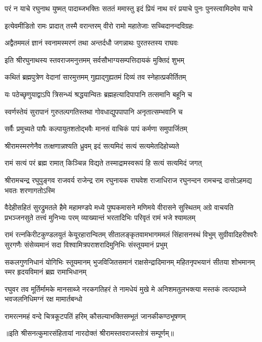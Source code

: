 \fourlineindentedshloka
{परं न याचे रघुनाथ युष्मत्}
{पादाब्जभक्तिः सततं ममास्तु}
{इदं प्रियं नाथ वरं प्रयाचे}
{पुनः पुनस्त्वामिदमेव याचे}%


\twolineshloka
{इत्येवमीडितो रामः प्रादात् तस्मै वरान्तरम्}
{वीरो रामो महातेजाः सच्चिदानन्दविग्रहः}%

\twolineshloka
{अद्वैतममलं ज्ञानं स्वनामस्मरणं तथा}
{अन्तर्दधौ जगन्नाथः पुरतस्तस्य राघवः}%

\twolineshloka
{इति श्रीरघुनाथस्य स्तवराजमनुत्तमम्}
{सर्वसौभाग्यसम्पत्तिदायकं मुक्तिदं शुभम्}%

\twolineshloka
{कथितं ब्रह्मपुत्रेण वेदानां सारमुत्तमम्}
{गुह्याद्गुह्यतमं दिव्यं तव स्नेहात्प्रकीर्तितम्}%

\twolineshloka
{यः पठेच्छृणुयाद्वाऽपि त्रिसन्ध्यं श्रद्धयान्वितः}
{ब्रह्महत्यादिपापानि तत्समानि बहूनि च}%

\twolineshloka
{स्वर्णस्तेयं सुरापानं गुरुतल्पगतिस्तथा}
{गोवधाद्युपपापानि अनृतात्सम्भवानि च}%

\twolineshloka
{सर्वैः प्रमुच्यते पापैः कल्पायुतशतोद्भवैः}
{मानसं वाचिकं पापं कर्मणा समुपार्जितम्}%

\twolineshloka
{श्रीरामस्मरणेनैव तत्क्षणान्नश्यति ध्रुवम्}
{इदं सत्यमिदं सत्यं सत्यमेतदिहोच्यते}%

\twolineshloka
{रामं सत्यं परं ब्रह्म रामात् किञ्चिन्न विद्यते}
{तस्माद्रामस्वरूपं हि सत्यं सत्यमिदं जगत्}%

\fourlineindentedshloka
{श्रीरामचन्द्र रघुपुङ्गव राजवर्य} 
{राजेन्द्र राम रघुनायक राघवेश}
{राजाधिराज रघुनन्दन रामचन्द्र}
{दासोऽहमद्य भवतः शरणागतोऽस्मि}%

\fourlineindentedshloka
{वैदेहीसहितं सुरद्रुमतले हैमे महामण्डपे}
{मध्ये पुष्पकमासने मणिमये वीरासने सुस्थितम्}
{अग्रे वाचयति प्रभञ्जनसुते तत्त्वं मुनिभ्यः परम्}
{व्याख्यान्तं भरतादिभिः परिवृतं रामं भजे श्यामलम्}%

\fourlineindentedshloka
{रामं रत्नकिरीटकुण्डलयुतं केयूरहारान्वितम्} 
{सीतालङ्कृतवामभागममलं सिंहासनस्थं विभुम्} 
{सुग्रीवादिहरीश्वरैः सुरगणैः संसेव्यमानं सदा}
{विश्वामित्रपराशरादिमुनिभिः संस्तूयमानं प्रभुम्}%

\fourlineindentedshloka
{सकलगुणनिधानं योगिभिः स्तूयमानम्} 
{भुजविजितसमानं राक्षसेन्द्रादिमानम्} 
{महितनृपभयानं सीतया शोभमानम्}
{स्मर हृदयविमानं ब्रह्म रामाभिधानम्}%

\fourlineindentedshloka
{रघुवर तव मूर्तिर्मामके मानसाब्जे} 
{नरकगतिहरं ते नामधेयं मुखे मे}
{अनिशमतुलभक्त्या मस्तकं त्वत्पदाब्जे}
{भवजलनिधिमग्नं रक्ष मामार्तबन्धो}%

\twolineshloka
{रामरत्नमहं वन्दे चित्रकूटपतिं हरिम्}
{कौसल्याभक्तिसम्भूतं जानकीकण्ठभूषणम्}%

॥इति श्रीसनत्कुमारसंहितायां नारदोक्तं श्रीरामस्तवराजस्तोत्रं सम्पूर्णम्॥